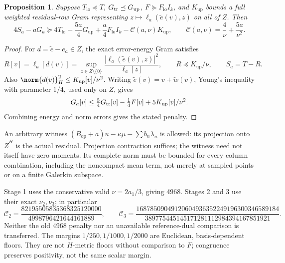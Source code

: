 \documentclass[11pt,a4paper]{article}
\numberwithin{equation}{section}
\newtheorem{proposition}[theorem]{Proposition}
\theoremstyle{definition}\newtheorem{definition}[theorem]{Definition}
\theoremstyle{remark}\newtheorem{remark}[theorem]{Remark}
\newcommand{\op}{\mathrm{op}}\newcommand{\lo}{\mathrm{lo}}\newcommand{\up}{\mathrm{up}}\newcommand{\eps}{\varepsilon}
\begin{document}
\begin{proposition}\label{vrg:prop:gate}
Suppose \(T_{\lo}\preceq T\), \(G_{\rm tr}\preceq G_{\up}\),
\(F\succeq F_{\lo}I_k\), and \(K_{\up}\) bounds a full weighted
residual-row Gram representing \(z\mapsto\ell_a(\widetilde e(v),z)\)
on all of \(Z\). Then
\[
4S_a-aG_a\succeq
4T_{\lo}-\frac{5a}{4}G_{\up}+\frac a4F_{\lo}I_k
 -\mathcal C(a,\nu)K_{\up},\qquad
\mathcal C(a,\nu)=\frac4\nu+\frac{5a}{\nu^2}.
\]
\end{proposition}
\begin{proof}
For \(d=\widetilde e-e_a\in Z\), the exact error-energy Gram satisfies
\[
R[v]=\ell_a[d(v)]
 =\sup_{z\in Z\setminus\{0\}}\frac{|\ell_a(\widetilde e(v),z)|^2}{\ell_a[z]},
\qquad R\preceq K_{\up}/\nu,\qquad S_a=T-R.
\]
Also \(\norm{d(v)}_H^2\leq K_{\up}[v]/\nu^2\).
Writing \(\widetilde e(v)=v+\widetilde w(v)\), Young's inequality with
parameter \(1/4\), used only on \(Z\), gives
\[
G_a[v]\leq\tfrac54G_{\rm tr}[v]-\tfrac14F[v]
                 +5K_{\up}[v]/\nu^2.
\]
Combining energy and norm errors gives the stated penalty.
\end{proof}
An arbitrary witness
\((B_{\op}+a)u-\kappa\mu-\sum b_n\lambda_n\) is allowed:
its projection onto \(\overline Z^{H}\) is the actual residual.
Projection contraction suffices; the witness need not itself have zero
moments. Its complete norm must be bounded for every column combination,
including the noncompact mean term, not merely at sampled points or on a
finite Galerkin subspace.

Stage 1 uses the conservative valid \(\nu=2a_1/3\), giving 4968.
Stages 2 and 3 use their exact \(\nu_2,\nu_3\); in particular
\[
\mathcal C_2=\frac{82195505835368325120000}{4998796421644161889},\qquad
\mathcal C_3=
\frac{16878509049120604936352249196300346589184}
 {389775445145171281112984394167851921}.
\]
Neither the old 4968 penalty nor an unavailable reference-dual comparison
is transferred. The margins \(1/250,1/1000,1/2000\) are Euclidean,
basis-dependent floors. They are not \(H\)-metric floors without comparison
to \(F\); congruence preserves positivity, not the same scalar margin.
\end{document}
